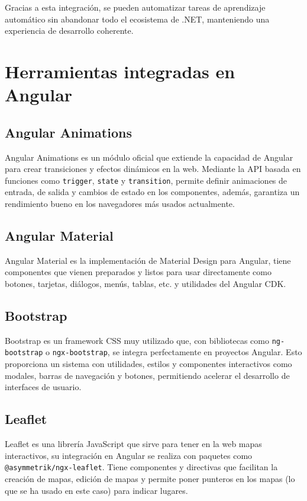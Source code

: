 Gracias a esta integración, se pueden automatizar tareas de aprendizaje automático sin abandonar todo el ecosistema de .NET, manteniendo una experiencia de desarrollo coherente.


\section{Herramientas integradas en Angular}

\subsection{Angular Animations}
Angular Animations es un módulo oficial que extiende la capacidad de Angular para crear transiciones y efectos dinámicos en la web. Mediante la API basada en funciones como \texttt{trigger}, \texttt{state} y \texttt{transition}, permite definir animaciones de entrada, de salida y cambios de estado en los componentes, además, garantiza un rendimiento bueno en los navegadores más usados actualmente.

\subsection{Angular Material}
Angular Material es la implementación de Material Design para Angular, tiene componentes que vienen preparados y listos para usar directamente como botones, tarjetas, diálogos, menús, tablas, etc. y utilidades del Angular CDK.

\subsection{Bootstrap}
Bootstrap es un framework CSS muy utilizado que, con bibliotecas como \texttt{ng-bootstrap} o \texttt{ngx-bootstrap}, se integra perfectamente en proyectos Angular. Esto proporciona un sistema con utilidades, estilos y componentes interactivos como modales, barras de navegación y botones, permitiendo acelerar el desarrollo de interfaces de usuario.

\subsection{Leaflet}
Leaflet es una librería JavaScript que sirve para tener en la web mapas interactivos, su integración en Angular se realiza con paquetes como \texttt{@asymmetrik/ngx-leaflet}. Tiene componentes y directivas que facilitan la creación de mapas, edición de mapas y permite poner punteros en los mapas (lo que se ha usado en este caso) para indicar lugares.

